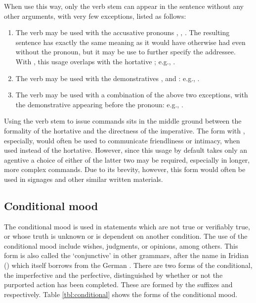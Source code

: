 When use this way, only the verb stem can appear in the sentence without any
other arguments, with very few exceptions, listed as follows:
\begin{enumerate}
	\item The verb may be used with the accusative pronouns , , . The resulting sentence
	has exactly the same meaning as it would have otherwise had even without the
	pronoun, but it may be use to further specify the addressee. With ,
	this usage overlaps with the hortative ; e.g., .
	\item The verb may be used with the demonstratives ,
	 and : e.g.,
	.
	\item The verb may be used with a combination of the above two exceptions,
	with the demonstrative appearing before the pronoun: e.g., .
\end{enumerate}

Using the verb stem to issue commands sits in the middle ground between the
formality of the hortative and the directness of the imperative. The form with
, especially, would often be used to communicate friendliness or
intimacy, when used instead of the hortative. However, since this usage by
default takes only an agentive a choice of either of the latter two may be
required, especially in longer, more complex commands. Due to its brevity,
however, this form would often be used in signages and other similar written
materials.

\subsection{Conditional mood}\label{sec:conditional}

The conditional mood is used in statements which are not true or verifiably true, or whose truth is unknown or is dependent on another condition. The use of the conditional mood include wishes, judgments, or opinions, among others. This form is also called the `conjunctive' in other grammars, after the name in Iridian () which itself borrows from the German . There are two forms of the conditional, the imperfective and the perfective, distinguished by whether or not the purported action has been completed. These are formed by the suffixes  and  respectively. Table \ref{tbl:conditional} shows the forms of the conditional mood.

